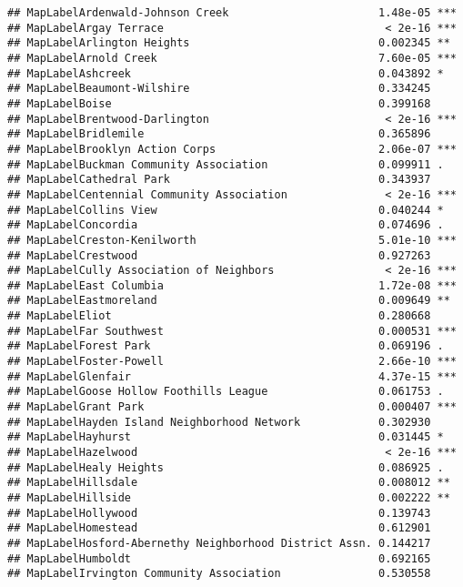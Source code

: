 \documentclass[]{article}
\begin{document}
\begin{verbatim}
## MapLabelArdenwald-Johnson Creek                       1.48e-05 ***
## MapLabelArgay Terrace                                  < 2e-16 ***
## MapLabelArlington Heights                             0.002345 ** 
## MapLabelArnold Creek                                  7.60e-05 ***
## MapLabelAshcreek                                      0.043892 *  
## MapLabelBeaumont-Wilshire                             0.334245    
## MapLabelBoise                                         0.399168    
## MapLabelBrentwood-Darlington                           < 2e-16 ***
## MapLabelBridlemile                                    0.365896    
## MapLabelBrooklyn Action Corps                         2.06e-07 ***
## MapLabelBuckman Community Association                 0.099911 .  
## MapLabelCathedral Park                                0.343937    
## MapLabelCentennial Community Association               < 2e-16 ***
## MapLabelCollins View                                  0.040244 *  
## MapLabelConcordia                                     0.074696 .  
## MapLabelCreston-Kenilworth                            5.01e-10 ***
## MapLabelCrestwood                                     0.927263    
## MapLabelCully Association of Neighbors                 < 2e-16 ***
## MapLabelEast Columbia                                 1.72e-08 ***
## MapLabelEastmoreland                                  0.009649 ** 
## MapLabelEliot                                         0.280668    
## MapLabelFar Southwest                                 0.000531 ***
## MapLabelForest Park                                   0.069196 .  
## MapLabelFoster-Powell                                 2.66e-10 ***
## MapLabelGlenfair                                      4.37e-15 ***
## MapLabelGoose Hollow Foothills League                 0.061753 .  
## MapLabelGrant Park                                    0.000407 ***
## MapLabelHayden Island Neighborhood Network            0.302930    
## MapLabelHayhurst                                      0.031445 *  
## MapLabelHazelwood                                      < 2e-16 ***
## MapLabelHealy Heights                                 0.086925 .  
## MapLabelHillsdale                                     0.008012 ** 
## MapLabelHillside                                      0.002222 ** 
## MapLabelHollywood                                     0.139743    
## MapLabelHomestead                                     0.612901    
## MapLabelHosford-Abernethy Neighborhood District Assn. 0.144217    
## MapLabelHumboldt                                      0.692165    
## MapLabelIrvington Community Association               0.530558    

\end{verbatim}
\end{document}
